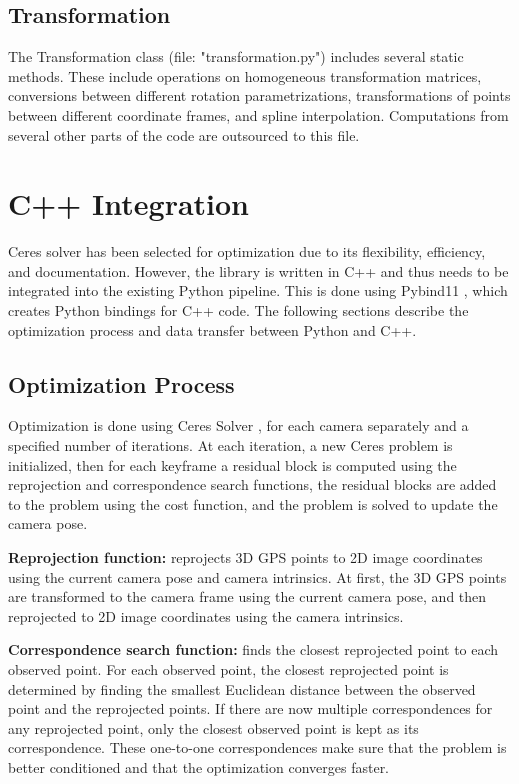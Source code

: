 \subsection*{Transformation}

The Transformation class (file: "transformation.py") includes several static methods. These include operations on homogeneous transformation matrices, conversions between different rotation parametrizations, transformations of points between different coordinate frames, and spline interpolation. Computations from several other parts of the code are outsourced to this file.

\section{C++ Integration}
\label{sec:c++_integration}

Ceres solver has been selected for optimization due to its flexibility, efficiency, and documentation. However, the library is written in C++ and thus needs to be integrated into the existing Python pipeline. This is done using Pybind11 \cite{wenzel2023pybind11}, which creates Python bindings for C++ code. The following sections describe the optimization process and data transfer between Python and C++.

\subsection*{Optimization Process}

Optimization is done using Ceres Solver \cite{agarwal2022ceres}, for each camera separately and a specified number of iterations. At each iteration, a new Ceres problem is initialized, then for each keyframe a residual block is computed using the reprojection and correspondence search functions, the residual blocks are added to the problem using the cost function, and the problem is solved to update the camera pose.

\textbf{Reprojection function:} reprojects 3D GPS points to 2D image coordinates using the current camera pose and camera intrinsics. At first, the 3D GPS points are transformed to the camera frame using the current camera pose, and then reprojected to 2D image coordinates using the camera intrinsics.

\textbf{Correspondence search function:} finds the closest reprojected point to each observed point. For each observed point, the closest reprojected point is determined by finding the smallest Euclidean distance between the observed point and the reprojected points. If there are now multiple correspondences for any reprojected point, only the closest observed point is kept as its correspondence. These one-to-one correspondences make sure that the problem is better conditioned and that the optimization converges faster.

